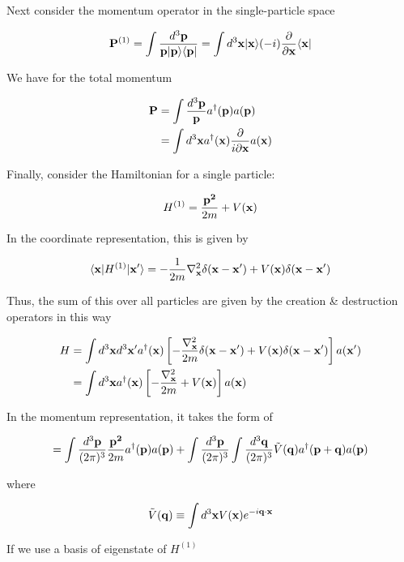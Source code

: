 Next consider the momentum operator in the single-particle space

\[{\bf P}^{(1)} = \int \frac{d^3\bf p}{\bf p|p\rangle\langle p|} = \int d^3{\bf x}|{\bf x}\rangle(-i)\frac{\partial}{\partial{\bf x}}\langle\bf x|  \]

We have for the total momentum

\begin{align}
\begin{split}
{\bf P} &=  \int \frac{d^3\bf p}{\bf p}a^\dagger({\bf p})a({\bf p})\\& = \int d^3{\bf x}a^\dagger({\bf x})\frac{\partial}{i\partial\bf x}a(\bf x)
\end{split}
\end{align}

Finally, consider the Hamiltonian for a single particle:

\[H^{(1)}=\frac{\bf p^2}{2m}+V(\bf x) \]

In the coordinate representation, this is given by

\[\langle{\bf x}|H^{(1)}|{\bf x'}\rangle = -\frac{1}{2m}\nabla_{\bf x}^2\delta({\bf x-x'})+V({\bf x})\delta(\bf x - x') \]

Thus, the sum of this over all particles are given by the creation \& destruction operators in this way

\begin{align}
\begin{split}
H &= \int d^3{\bf x}d^3{\bf x'}a^\dagger({\bf x})\left[-\frac{\nabla_{\bf x}^2}{2m}\delta({\bf x-x'})+V({\bf x})\delta({\bf x - x'})\right]a(\bf x')\\
&=\int d^3{\bf x}a^\dagger({\bf x})\left[-\frac{\nabla_{\bf x}^2}{2m}+V({\bf x})\right]a(\bf x)
\end{split}
\end{align}

In the momentum representation, it takes the form of

\begin{align}
=\int\frac{d^3\bf p}{(2\pi)^3} \frac{\bf p^2}{2m}a^\dagger({\bf p})a({\bf p})+\int\frac{d^3\bf p}{(2\pi)^3}\int\frac{d^3\bf q}{(2\pi)^3}\tilde{V}({\bf q})a^\dagger({\bf p+q})a({\bf p})
\end{align}

where 

\[\tilde{V}({\bf q}) \equiv\int d^3{\bf x} V({\bf x})e^{-i\bf q\cdot x} \]

If we use a basis of eigenstate of $H^{(1)}$

